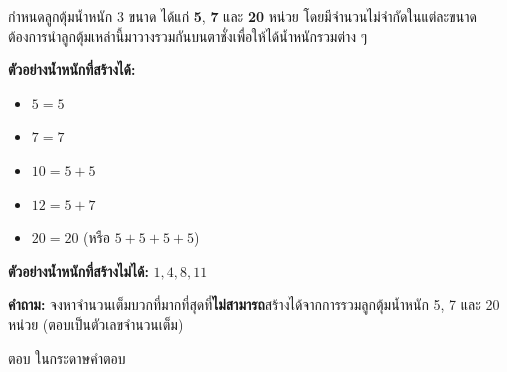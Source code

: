 \question กำหนดลูกตุ้มน้ำหนัก 3 ขนาด ได้แก่ \textbf{5}, \textbf{7} และ \textbf{20} หน่วย โดยมีจำนวนไม่จำกัดในแต่ละขนาด ต้องการนำลูกตุ้มเหล่านี้มาวางรวมกันบนตาชั่งเพื่อให้ได้น้ำหนักรวมต่าง ๆ

\textbf{ตัวอย่างน้ำหนักที่สร้างได้:}
\begin{itemize}
  \item $5 = 5$
  \item $7 = 7$
  \item $10 = 5 + 5$
  \item $12 = 5 + 7$
  \item $20 = 20$ (หรือ $5+5+5+5$)
\end{itemize}

\textbf{ตัวอย่างน้ำหนักที่สร้างไม่ได้:} $1, 4, 8, 11$

\medskip
\textbf{คำถาม:} จงหาจำนวนเต็มบวกที่มากที่สุดที่\textbf{ไม่สามารถ}สร้างได้จากการรวมลูกตุ้มน้ำหนัก 5, 7 และ 20 หน่วย (ตอบเป็นตัวเลขจำนวนเต็ม)

\par\medskip
ตอบ ในกระดาษคำตอบ
